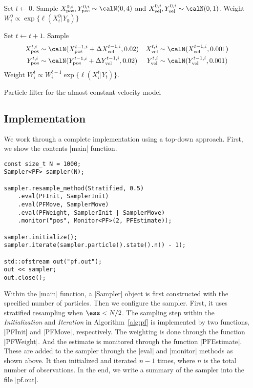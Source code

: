 \begin{algorithm}[t]
  \begin{algorithmic}
    \tophrule
    \STATE {}
    \STATE Set $t\leftarrow0$.
    \STATE Sample $\xpos^{0,i},\ypos^{0,i}\sim\calN(0,4)$ and
    $\xvel^{0,i},\yvel^{0,i}\sim\calN(0,1)$.
    \STATE Weight $W_i^0 \propto \exp\{\ell(X_i^0 \vert Y_0)\}$

    \REPEAT
    \STATE {}
    \STATE Set $t\leftarrow t + 1$.
    \STATE Sample
    \begin{align*}
      \xpos^{t,i}&\sim\calN(\xpos^{t-1,i} + \Delta\xvel^{t-1,i}, 0.02) &
      \xvel^{t,i}&\sim\calN(\xvel^{t-1,i}, 0.001) \\
      \ypos^{t,i}&\sim\calN(\ypos^{t-1,i} + \Delta\yvel^{t-1,i}, 0.02) &
      \yvel^{t,i}&\sim\calN(\yvel^{t-1,i}, 0.001)
    \end{align*}
    \STATE Weight $W_i^t \propto W_i^{t - 1}\exp\{\ell(X_i^t \vert Y_t)\}$.
    \bottomhrule
  \end{algorithmic}
  \caption{Particle filter for the almost constant velocity model}
  \label{alg:pf}
\end{algorithm}

\subsection{Implementation}
\label{sub:Implementation (PF)}

We work through a complete implementation using a top-down approach. First, we
show the contents |main| function.
\begin{verbatim}
const size_t N = 1000;
Sampler<PF> sampler(N);

sampler.resample_method(Stratified, 0.5)
    .eval(PFInit, SamplerInit)
    .eval(PFMove, SamplerMove)
    .eval(PFWeight, SamplerInit | SamplerMove)
    .monitor("pos", Monitor<PF>(2, PFEstimate));

sampler.initialize();
sampler.iterate(sampler.particle().state().n() - 1);

std::ofstream out("pf.out");
out << sampler;
out.close();
\end{verbatim}
Within the |main| function, a |Sampler| object is first constructed with the
specified number of particles. Then we configure the sampler. First, it  uses
stratified resampling when $\ess < N / 2$. The sampling step within the
\emph{Initialization} and \emph{Iteration} in Algorithm~\ref{alg:pf} is
implemented by two functions, |PFInit| and |PFMove|, respectively. The
weighting is done through the function |PFWeight|. And the estimate is
monitored through the function |PFEstimate|. These are added to the sampler
through the |eval| and |monitor| methods as shown above. It then initialized
and iterated $n - 1$ times, where $n$ is the total number of observations. In
the end, we write a summary of the sampler into the file |pf.out|.


